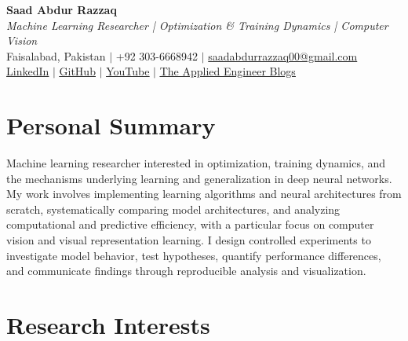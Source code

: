 \documentclass[10.5pt,a4paper]{article}
\begin{document}
\begin{center}
    {\LARGE \bfseries Saad Abdur Razzaq}\\[3pt]

    \textit{Machine Learning Researcher | Optimization \& Training Dynamics | Computer Vision}\\[3pt]

    Faisalabad, Pakistan
    \quad $\vert$ \quad
    +92 303-6668942
    \quad $\vert$ \quad
    \href{mailto:saadabdurrazzaq00@gmail.com}
    {saadabdurrazzaq00@gmail.com}
    \\[2pt]

    \href{https://linkedin.com/in/saadarazzaq/}
    {\underline{LinkedIn}}
    \quad $\vert$ \quad
    \href{https://github.com/SaadARazzaq}
    {\underline{GitHub}}
    \quad $\vert$ \quad
    \href{https://youtube.com/@SaadARazzaq}
    {\underline{YouTube}}
    \quad $\vert$ \quad
    \href{https://theappliedengineer.substack.com/}
    {\underline{The Applied Engineer Blogs}}
\end{center}


\section*{Personal Summary}

Machine learning researcher interested in optimization, training dynamics, and the mechanisms underlying learning and generalization in deep neural networks. My work involves implementing learning algorithms and neural architectures from scratch, systematically comparing model architectures, and analyzing computational and predictive efficiency, with a particular focus on computer vision and visual representation learning. I design controlled experiments to investigate model behavior, test hypotheses, quantify performance differences, and communicate findings through reproducible analysis and visualization.



\section*{Research Interests}
\end{document}
